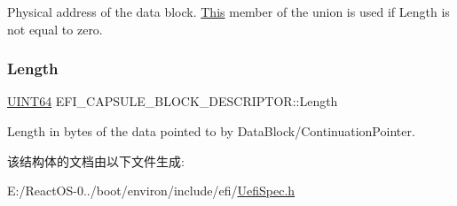 Physical address of the data block. \hyperlink{namespace_this}{This} member of the union is used if Length is not equal to zero. \mbox{\label{struct_e_f_i___c_a_p_s_u_l_e___b_l_o_c_k___d_e_s_c_r_i_p_t_o_r_a261499de5fae79ccdecfa7d3c4267a85}} 
\subsubsection{\texorpdfstring{Length}{Length}}
{\footnotesize\ttfamily \hyperlink{_processor_bind_8h_a57be03562867144161c1bfee95ca8f7c}{U\+I\+N\+T64} E\+F\+I\+\_\+\+C\+A\+P\+S\+U\+L\+E\+\_\+\+B\+L\+O\+C\+K\+\_\+\+D\+E\+S\+C\+R\+I\+P\+T\+O\+R\+::\+Length}

Length in bytes of the data pointed to by Data\+Block/\+Continuation\+Pointer. 

该结构体的文档由以下文件生成\+:\begin{DoxyCompactItemize}
\item 
E\+:/\+React\+O\+S-\/0../boot/environ/include/efi/\hyperlink{_uefi_spec_8h}{Uefi\+Spec.\+h}\end{DoxyCompactItemize}
